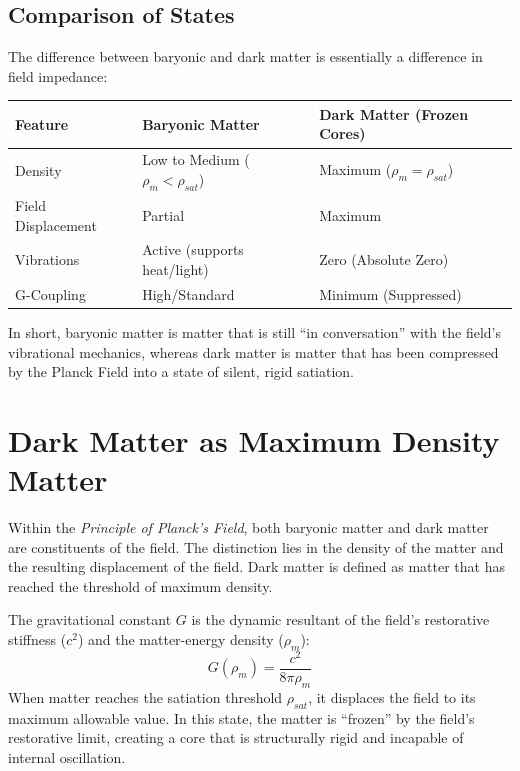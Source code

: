 \documentclass[12pt,a4paper]{article}
\begin{document}
\subsection{Comparison of States}
The difference between baryonic and dark matter is essentially a difference in field impedance:

\begin{center}
\begin{tabular}{lll}
\toprule
\textbf{Feature} & \textbf{Baryonic Matter} & \textbf{Dark Matter (Frozen Cores)} \\
\midrule
Density & Low to Medium ($\rho_m < \rho_{sat}$) & Maximum ($\rho_m = \rho_{sat}$) \\
Field Displacement & Partial & Maximum \\
Vibrations & Active (supports heat/light) & Zero (Absolute Zero) \\
G-Coupling & High/Standard & Minimum (Suppressed) \\
\bottomrule
\end{tabular}
\end{center}

In short, baryonic matter is matter that is still ``in conversation'' with the field's vibrational mechanics, whereas dark matter is matter that has been compressed by the Planck Field into a state of silent, rigid satiation.

\section{Dark Matter as Maximum Density Matter}
Within the \textit{Principle of Planck's Field}, both baryonic matter and dark matter are constituents of the field. The distinction lies in the density of the matter and the resulting displacement of the field. Dark matter is defined as matter that has reached the threshold of maximum density.

The gravitational constant $G$ is the dynamic resultant of the field's restorative stiffness ($c^2$) and the matter-energy density ($\rho_m$):
\begin{equation}
G(\rho_m) = \frac{c^2}{8\pi\rho_m}
\end{equation}
When matter reaches the satiation threshold $\rho_{sat}$, it displaces the field to its maximum allowable value. In this state, the matter is ``frozen'' by the field's restorative limit, creating a core that is structurally rigid and incapable of internal oscillation.
\end{document}

